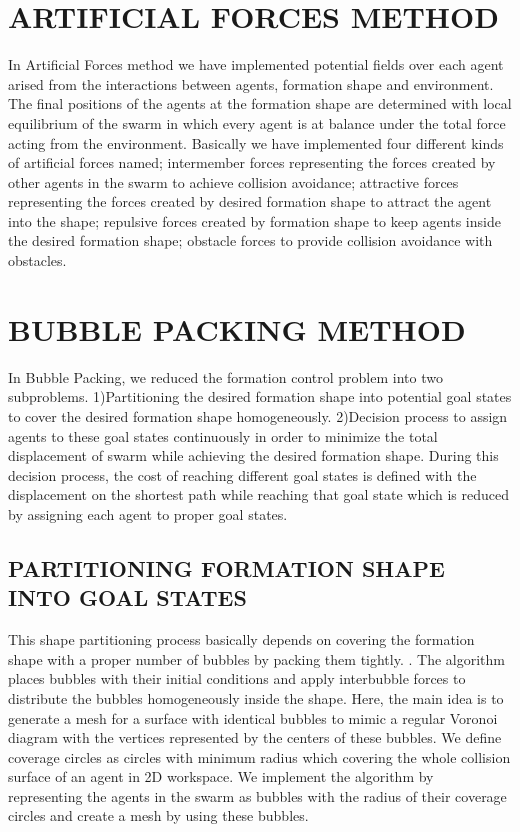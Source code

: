 \documentclass[letterpaper, 10 pt, conference]{ieeeconf}  %
\begin{document}
\section{ARTIFICIAL FORCES METHOD}
In Artificial Forces method we have implemented potential fields over each agent arised from the interactions between agents, formation shape and environment. The final positions of the agents at the formation shape  are determined with local equilibrium of the swarm in which every agent is at balance under the total force acting from the environment. Basically we have implemented four different kinds of artificial forces named; intermember forces representing the forces created by other agents in the swarm to achieve collision avoidance; attractive forces representing the forces created by desired formation shape to attract the agent into the shape; repulsive forces created by formation shape to keep agents inside the desired formation shape; obstacle forces to provide collision avoidance with obstacles.

\section{BUBBLE PACKING METHOD}
In Bubble Packing, we reduced the formation control problem into two subproblems. 1)Partitioning the desired formation shape into potential goal states to cover the desired formation shape homogeneously. 2)Decision process to assign agents to these goal states continuously in order to minimize the total displacement of swarm while achieving the desired formation shape. During this decision process, the cost of reaching different goal states is defined with the displacement on the shortest path while reaching that goal state which is reduced by assigning each agent to proper goal states.
			
\subsection{PARTITIONING FORMATION SHAPE INTO GOAL STATES} \label{Partitioning_ref}		
This shape partitioning process basically depends on covering the formation shape with a proper number of bubbles by packing them tightly. \cite{27}.  The algorithm places bubbles with their initial conditions and apply interbubble forces to distribute the bubbles homogeneously inside the shape. Here, the main idea is to generate a mesh for a surface with identical bubbles to mimic a regular Voronoi diagram with the vertices represented by the centers of these bubbles. We define coverage circles as circles with minimum radius which covering the whole collision surface of an agent in 2D workspace. We implement the algorithm by representing the agents in the swarm as bubbles with the radius of their coverage circles and create a mesh by using these bubbles. 
			
\end{document}
